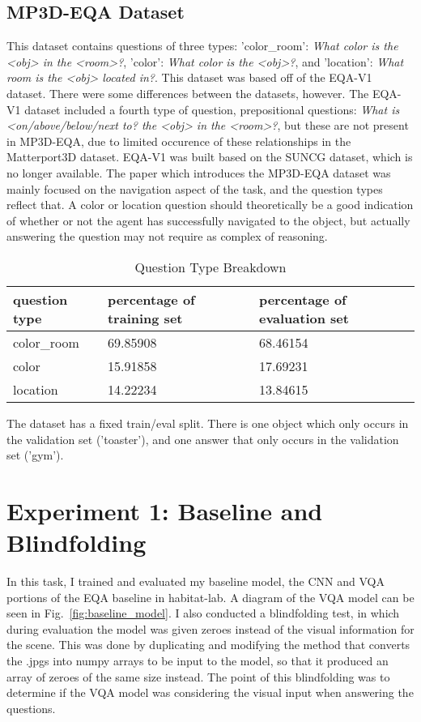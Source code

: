\subsection{MP3D-EQA Dataset} 
This dataset contains questions of three types: 'color\_room': \emph{What color is the <obj> in the <room>?}, 'color': \emph{What color is the <obj>?}, and 'location': \emph{What room is the <obj> located in?}.  This dataset was based off of the EQA-V1 dataset\cite{embodiedqa}. There were some differences between the datasets, however. The EQA-V1 dataset included a fourth type of question, prepositional questions: \emph{What is <on/above/below/next to? the <obj> in the <room>?}, but these are not present in MP3D-EQA, due to limited occurence of these relationships in the Matterport3D dataset. EQA-V1 was built based on the SUNCG dataset, which is no longer available. 
The paper which introduces the MP3D-EQA dataset was mainly focused on the navigation aspect of the task, and the question types reflect that. A color or location question should theoretically be a good indication of whether or not the agent has successfully navigated to the object, but actually answering the question may not require as complex of reasoning. 

\begin{table}[h]
\centering
\caption{Question Type Breakdown}
\begin{tabular}{ |l|l|l| }
\hline
\textbf{question type} & \textbf{percentage of training set} & \textbf{percentage of evaluation set} \\
\hline
color\_room & 69.85908 & 68.46154\\
color & 15.91858 & 17.69231\\
location & 14.22234 & 13.84615\\
\hline
\end{tabular}
\label{tab:q_breakdown}
\end{table}

The dataset has a fixed train/eval split. There is one object which only occurs in the validation set ('toaster'), and one answer that only occurs in the validation set ('gym'). 

\section{Experiment 1: Baseline and Blindfolding}
\label{sec:exp_1}
In this task, I trained and evaluated my baseline model, the CNN and VQA portions of the EQA baseline in habitat-lab. A diagram of the VQA model can be seen in Fig.~\ref{fig:baseline_model}. I also conducted a blindfolding test, in which during evaluation the model was given zeroes instead of the visual information for the scene. This was done by duplicating and modifying the method that converts the .jpgs into numpy arrays to be input to the model, so that it produced an array of zeroes of the same size instead. The point of this blindfolding was to determine if the VQA model was considering the visual input when answering the questions. 

